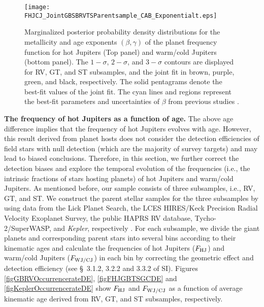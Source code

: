 \documentclass[twocolumn]{pnas-new}
\begin{document}
\begin{figure}[!t]
\centering
\texttt{[image: FHJCJ\_JointGBSBRVTSParentsample\_CAB\_Exponentialt.eps]}
\caption{Marginalized posterior probability density distributions for the metallicity and age exponents $(\beta, \gamma)$ of the planet frequency function for hot Jupiters (Top panel) and warm/cold Jupiters (bottom panel). The $1-\sigma$, $2-\sigma$, and $3-\sigma$ contours are displayed for RV, GT, and ST subsamples, and the joint fit in brown, purple, green, and black, respectively.
The solid pentagrams denote the best-fit values of the joint fit.
The cyan lines and regions represent the best-fit parameters and uncertainties of $\beta$ from previous studies \citep{2010PASP..122..905J,2017ApJ...838...25G}.
\label{figFHJCJ_JointGBSBRVTS_ABFittting}}
\end{figure}



\noindent \textbf{The frequency of hot Jupiters as a function of age.}
The above age difference implies that  the frequency of hot Jupiters evolves with age.
However, this result derived from planet hosts does not consider the detection efficiencies of field stars with null detection (which are the majority of survey targets) and may lead to biased conclusions.
Therefore, in this section, we further correct the detection biases and explore the temporal evolution of the frequencies (i.e., the intrinsic fractions of stars hosting planets) of hot Jupiters and warm/cold Jupiters. 
As mentioned before, our sample consists of three subsamples, i.e., RV, GT, and ST.
We construct the parent stellar samples for the three subsamples by using data from the Lick Planet Search, the LCES HIRES/Keck Precision Radial Velocity Exoplanet Survey, the public HAPRS RV database, Tycho-2/SuperWASP, and {\it Kepler}, respectively \citep[see \S~3.1.1, 3.2.1, 3.3.1 of SI;][]{2014ApJS..210....5F,2017AJ....153..208B,2020A&A...636A..74T,2021AJ....162..100C,2000A&A...355L..27H,2007ASPC..366..187W,2007MNRAS.381..851C}.
For each subsample, we divide the giant planets and corresponding parent stars into several bins according to their kinematic ages and calculate the frequencies of hot Jupiters ($F_{\rm HJ}$) and warm/cold Jupiters ($F_{\rm WJ/CJ}$) in each bin by correcting the geometric effect and detection efficiency (see \S~3.1.2, 3.2.2 and 3.3.2 of SI).
Figures \ref{figGBRVOccurrencerateDE}, \ref{figFHJGBTSGCDE} and \ref{figKeplerOccurrencerateDE} show $F_{\rm HJ}$ and $F_{\rm WJ/CJ}$ as a function of average kinematic age derived from RV, GT, and ST subsamples, respectively.
\end{document}
